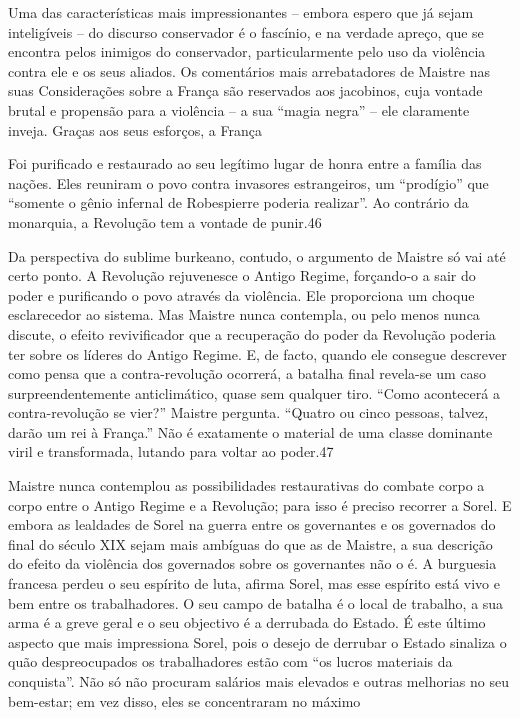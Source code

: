  \par 
Uma das características mais impressionantes – embora espero que já sejam inteligíveis – do discurso conservador é o fascínio, e na verdade apreço, que se encontra pelos inimigos do conservador, particularmente pelo uso da violência contra ele e os seus aliados. Os comentários mais arrebatadores de Maistre nas suas Considerações sobre a França são reservados aos jacobinos, cuja vontade brutal e propensão para a violência – a sua “magia negra” – ele claramente inveja. Graças aos seus esforços, a França
 \par 
Foi purificado e restaurado ao seu legítimo lugar de honra entre a família das nações. Eles reuniram o povo contra invasores estrangeiros, um “prodígio” que “somente o gênio infernal de Robespierre poderia realizar”. Ao contrário da monarquia, a Revolução tem a vontade de punir.{\color{blue}46}
 \par 
Da perspectiva do sublime burkeano, contudo, o argumento de Maistre só vai até certo ponto. A Revolução rejuvenesce o Antigo Regime, forçando-o a sair do poder e purificando o povo através da violência. Ele proporciona um choque esclarecedor ao sistema. Mas Maistre nunca contempla, ou pelo menos nunca discute, o efeito revivificador que a recuperação do poder da Revolução poderia ter sobre os líderes do Antigo Regime. E, de facto, quando ele consegue descrever como pensa que a contra-revolução ocorrerá, a batalha final revela-se um caso surpreendentemente anticlimático, quase sem qualquer tiro. “Como acontecerá a contra-revolução se vier?” Maistre pergunta. “Quatro ou cinco pessoas, talvez, darão um rei à França.” Não é exatamente o material de uma classe dominante viril e transformada, lutando para voltar ao poder.{\color{blue}47}
 \par 
Maistre nunca contemplou as possibilidades restaurativas do combate corpo a corpo entre o Antigo Regime e a Revolução; para isso é preciso recorrer a Sorel. E embora as lealdades de Sorel na guerra entre os governantes e os governados do final do século XIX sejam mais ambíguas do que as de Maistre, a sua descrição do efeito da violência dos governados sobre os governantes não o é. A burguesia francesa perdeu o seu espírito de luta, afirma Sorel, mas esse espírito está vivo e bem entre os trabalhadores. O seu campo de batalha é o local de trabalho, a sua arma é a greve geral e o seu objectivo é a derrubada do Estado. É este último aspecto que mais impressiona Sorel, pois o desejo de derrubar o Estado sinaliza o quão despreocupados os trabalhadores estão com “os lucros materiais da conquista”. Não só não procuram salários mais elevados e outras melhorias no seu bem-estar; em vez disso, eles se concentraram no máximo
